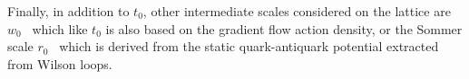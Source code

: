 Finally, in addition to $t_0$, other intermediate scales considered on the lattice are $w_0$~\citep{BMW:2012hcm,Kostrzewa:2021syw,MILC:2015tqx} which like $t_0$ is also based on the gradient flow action density, or the Sommer scale $r_0$~\citep{Sommer:1993ce,Necco:2001xg,Bernard:2000gd} which is derived from the static quark-antiquark potential extracted from Wilson loops. 

